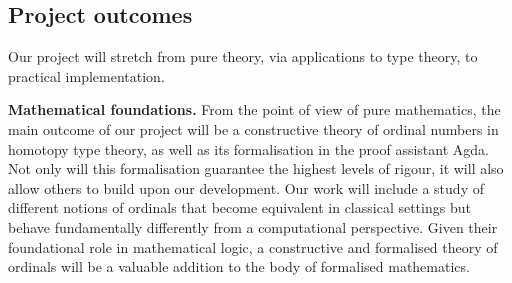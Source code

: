 \documentclass[a4paper,11pt]{article}
\renewcommand{\paragraph}[1]{\textbf{#1.}}
\begin{document}









%
\subsection{Project outcomes}\label{project-outcomes}

Our project will stretch from pure theory, via applications to type theory, to practical implementation. %

\paragraph{Mathematical foundations}
From the point of view of pure mathematics,
the main outcome of our project will be a constructive theory of ordinal numbers in homotopy type theory, as well as its formalisation in the proof assistant Agda.
Not only will this formalisation guarantee the highest levels of rigour, it will also allow others to build upon our development.
Our work will include a %
study of different notions of ordinals that become equivalent in classical settings but behave fundamentally differently from a computational perspective.
Given their %
foundational role %
in mathematical logic, a constructive and formalised theory of ordinals
will be a valuable addition to the body of formalised mathematics.
\end{document}
